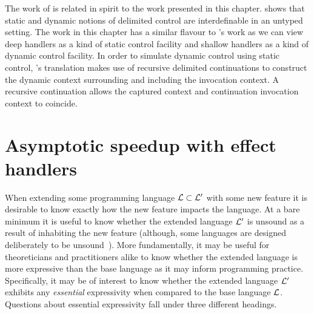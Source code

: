 \documentclass[12pt,phd,lfcs,twoside,openright,logo,leftchapter,normalheadings]{infthesis}
\theoremstyle{plain}
\theoremstyle{definition}
\begin{document}
The work of \citet{Shan04,Shan07} is related in spirit to the work
presented in this chapter. \citeauthor{Shan04} shows that static and
dynamic notions of delimited control are interdefinable in an untyped
setting. The work in this chapter has a similar flavour to
\citeauthor{Shan04}'s work as we can view deep handlers as a kind of
static control facility and shallow handlers as a kind of dynamic
control facility. In order to simulate dynamic control using static
control, \citeauthor{Shan04}'s translation makes use of recursive
delimited continuations to construct the dynamic context surrounding
and including the invocation context. A recursive continuation allows
the captured context and continuation invocation context to coincide.


\chapter{Asymptotic speedup with effect handlers}
\label{ch:handlers-efficiency}
%
When extending some programming language $\mathcal L \subset \mathcal L'$ with
some new feature it is desirable to know exactly how the new feature
impacts the language. At a bare minimum it is useful to know whether
the extended language $\mathcal L'$ is unsound as a result of inhabiting the
new feature (although, some languages are designed deliberately to be
unsound~\cite{BiermanAT14}). More fundamentally, it may be useful for
theoreticians and practitioners alike to know whether the extended
language is more expressive than the base language as it may inform
programming practice.
%
Specifically, it may be of interest to know whether the extended
language $\mathcal L'$ exhibits any \emph{essential} expressivity when
compared to the base language $\mathcal L$. Questions about essential
expressivity fall under three different headings.

\end{document}
